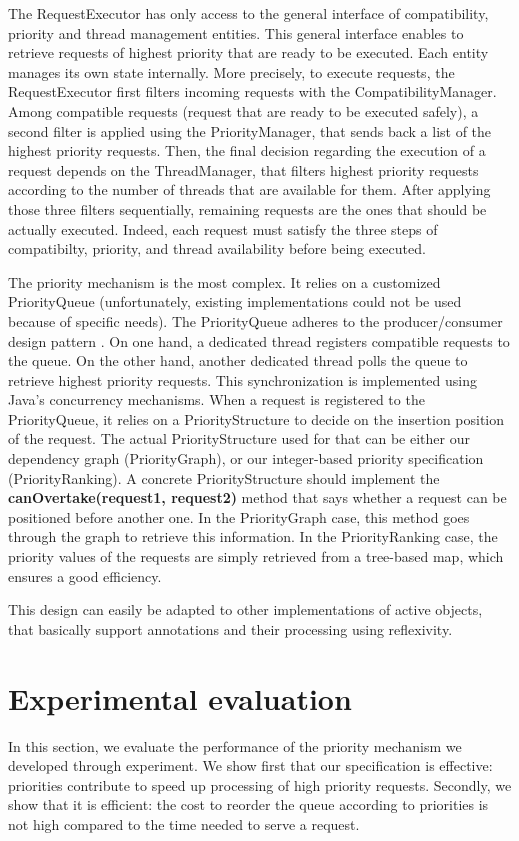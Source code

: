 \documentclass[11pt]{report}
\begin{document}
The RequestExecutor has only access to the general interface of compatibility, priority and thread management entities. This general interface enables to retrieve requests of highest priority that are ready to be executed. Each entity manages its own state internally. More precisely, to execute requests, the RequestExecutor first filters incoming requests with the CompatibilityManager. Among compatible requests (request that are ready to be executed safely), a second filter is applied using the PriorityManager, that sends back a list of the highest priority requests. Then, the final decision regarding the execution of a request depends on the ThreadManager, that filters highest priority requests according to the number of threads that are available for them. After applying those three filters sequentially, remaining requests are the ones that should be actually executed. Indeed, each request must satisfy the three steps of compatibilty, priority, and thread availability before being executed. 

The priority mechanism is the most complex. It relies on a customized PriorityQueue (unfortunately, existing implementations could not be used because of specific needs). The PriorityQueue adheres to the producer/consumer design pattern \cite{ref:producerconsumer}. On one hand, a dedicated thread registers compatible requests to the queue. On the other hand, another dedicated thread polls the queue to retrieve highest priority requests. This synchronization is implemented using Java's concurrency mechanisms. When a request is registered to the PriorityQueue, it relies on a PriorityStructure to decide on the insertion position of the request. The actual PriorityStructure used for that can be either our dependency graph (PriorityGraph), or our integer-based priority specification (PriorityRanking). A concrete PriorityStructure should implement the \textbf{canOvertake(request1, request2)} method that says whether a request can be positioned before another one. In the PriorityGraph case, this method goes through the graph to retrieve this information. In the PriorityRanking case, the priority values of the requests are simply retrieved from a tree-based map, which ensures a good efficiency.

This design can easily be adapted to other implementations of active objects, that basically support annotations and their processing using reflexivity. 


\section{Experimental evaluation}\label{sec:experiments}
In this section, we evaluate the performance of the priority mechanism we developed through experiment. 
We show first that our specification is effective: priorities contribute to speed up processing of high priority requests. Secondly, we show that it is efficient: the cost to reorder the queue according to priorities is not high compared to the time needed to serve a request.
\end{document}
